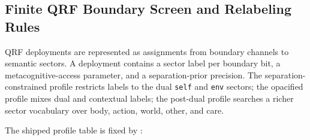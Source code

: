 \documentclass[
]{article}
\begin{document}
\subsection{Finite QRF Boundary Screen and Relabeling
Rules}\label{sec:methods-finite-qrf-boundary-screen}

QRF deployments are represented as assignments from boundary channels to
semantic sectors. A deployment contains a sector label per boundary bit,
a metacognitive-access parameter, and a separation-prior precision. The
separation-constrained profile restricts labels to the dual
\texttt{self} and \texttt{env} sectors; the opacified profile mixes dual
and contextual labels; the post-dual profile searches a richer sector
vocabulary over body, action, world, other, and care.

The shipped profile table is fixed by
:
\end{document}
